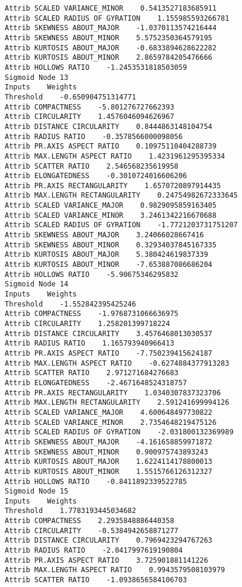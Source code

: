 \documentclass[
	article,			%
	11pt,				%
	oneside,			%
	a4paper,			%
	english,			%
	brazil,				%
	sumario=tradicional
	]{abntex2}
\begin{document}
\begin{lstlisting}
Attrib SCALED VARIANCE_MINOR    0.5413527183685911
Attrib SCALED RADIUS OF GYRATION    1.155985593266781
Attrib SKEWNESS ABOUT_MAJOR    -1.0370113574216444
Attrib SKEWNESS ABOUT_MINOR    5.5752350364579195
Attrib KURTOSIS ABOUT_MAJOR    -0.6833894628622282
Attrib KURTOSIS ABOUT_MINOR    2.8659784205476666
Attrib HOLLOWS RATIO    -1.2453531818503059
Sigmoid Node 13
Inputs    Weights
Threshold    -0.650904751314771
Attrib COMPACTNESS    -5.801276727662393
Attrib CIRCULARITY    1.4576046094626967
Attrib DISTANCE CIRCULARITY    0.8444863148104754
Attrib RADIUS RATIO    -0.3578566000098056
Attrib PR.AXIS ASPECT RATIO    0.10975110404288739
Attrib MAX.LENGTH ASPECT RATIO    1.4231961295395334
Attrib SCATTER RATIO    2.546568235619958
Attrib ELONGATEDNESS    -0.3010724016606206
Attrib PR.AXIS RECTANGULARITY    1.6570720897914435
Attrib MAX.LENGTH RECTANGULARITY    0.24754982672333645
Attrib SCALED VARIANCE_MAJOR    0.9829095859163405
Attrib SCALED VARIANCE_MINOR    3.2461342216670688
Attrib SCALED RADIUS OF GYRATION    -1.7721203731751207
Attrib SKEWNESS ABOUT_MAJOR    3.24066028667416
Attrib SKEWNESS ABOUT_MINOR    0.32934037845167335
Attrib KURTOSIS ABOUT_MAJOR    5.380424619837339
Attrib KURTOSIS ABOUT_MINOR    -7.653887086686204
Attrib HOLLOWS RATIO    -5.90675346295832
Sigmoid Node 14
Inputs    Weights
Threshold    -1.552842395425246
Attrib COMPACTNESS    -1.9768731066636975
Attrib CIRCULARITY    1.258201399718224
Attrib DISTANCE CIRCULARITY    3.4576468013030537
Attrib RADIUS RATIO    1.165793940966413
Attrib PR.AXIS ASPECT RATIO    -7.750239415624187
Attrib MAX.LENGTH ASPECT RATIO    -0.6274884377913283
Attrib SCATTER RATIO    2.971271684276683
Attrib ELONGATEDNESS    -2.4671648524318757
Attrib PR.AXIS RECTANGULARITY    1.0340307837323706
Attrib MAX.LENGTH RECTANGULARITY    2.591241699994126
Attrib SCALED VARIANCE_MAJOR    4.600648497730822
Attrib SCALED VARIANCE_MINOR    2.7354648219475126
Attrib SCALED RADIUS OF GYRATION    -2.031800132369989
Attrib SKEWNESS ABOUT_MAJOR    -4.161658859971872
Attrib SKEWNESS ABOUT_MINOR    0.900975743893243
Attrib KURTOSIS ABOUT_MAJOR    1.6224114178800013
Attrib KURTOSIS ABOUT_MINOR    1.5515766126312327
Attrib HOLLOWS RATIO    -0.8411892339522785
Sigmoid Node 15
Inputs    Weights
Threshold    1.7783193445034682
Attrib COMPACTNESS    2.2935848886440358
Attrib CIRCULARITY    -0.5384942658871277
Attrib DISTANCE CIRCULARITY    0.7969423294767263
Attrib RADIUS RATIO    -2.0417997619190804
Attrib PR.AXIS ASPECT RATIO    3.725901881141226
Attrib MAX.LENGTH ASPECT RATIO    0.9943579508103979
Attrib SCATTER RATIO    -1.0938656584106703

\end{lstlisting}
\end{document}
